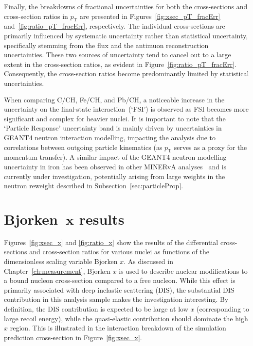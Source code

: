 Finally, the breakdowns of fractional uncertainties for both the cross-sections and cross-section ratios in $p_{\text{T}}$ are presented in Figures~\ref{fig:xsec_pT_fracErr} and~\ref{fig:ratio_pT_fracErr}, respectively. The individual cross-sections are primarily influenced by systematic uncertainty rather than statistical uncertainty, specifically stemming from the flux and the antimuon reconstruction uncertainties. These two sources of uncertainty tend to cancel out to a large extent in the cross-section ratios, as evident in Figure~\ref{fig:ratio_pT_fracErr}. Consequently, the cross-section ratios become predominantly limited by statistical uncertainties.

When comparing C/CH, Fe/CH, and Pb/CH, a noticeable increase in the uncertainty on the final-state interaction~(`FSI') is observed as FSI becomes more significant and complex for heavier nuclei. It is important to note that the `Particle Response' uncertainty band is mainly driven by uncertainties in GEANT4 neutron interaction modelling, impacting the analysis due to correlations between outgoing particle kinematics (as $p_{\text{T}}$ serves as a proxy for the momentum transfer). A similar impact of the GEANT4 neutron modelling uncertainty in iron has been observed in other MINERvA analyses~\cite{Bercellie2023_PhysRevLett.131.011801} and is currently under investigation, potentially arising from large weights in the neutron reweight described in Subsection~\ref{sec:particleProp}. %
\clearpage
\section[Bjorken~$x$ results]{Bjorken~$\bm{x}$ results}


Figures~\ref{fig:xsec_x} and \ref{fig:ratio_x} show the results of the differential cross-sections and cross-section ratios for various nuclei as functions of the dimensionless scaling variable Bjorken $x$. As discussed in Chapter~\ref{ch:measurement}, Bjorken $x$ is used to describe nuclear modifications to a bound nucleon cross-section compared to a free nucleon. While this effect is primarily associated with deep inelastic scattering (DIS), the substantial DIS contribution in this analysis sample makes the investigation interesting. By definition, the DIS contribution is expected to be large at low $x$ (corresponding to large recoil energy), while the quasi-elastic contribution should dominate the high $x$ region. This is illustrated in the interaction breakdown of the simulation prediction cross-section in Figure~\ref{fig:xsec_x}.

